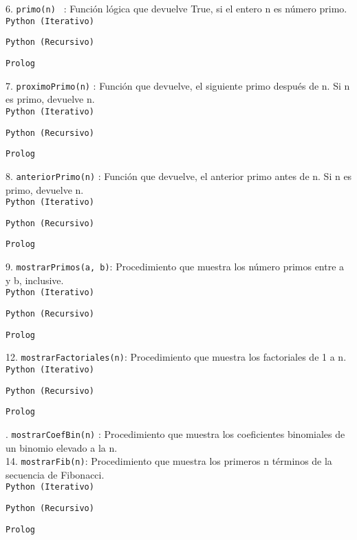 \documentclass[10pt,letterpaper]{article}
\begin{document}
6. \texttt{primo(n) } : Función lógica que devuelve True, si el entero n es número primo. \\

\texttt{Python (Iterativo)}


\texttt{Python (Recursivo)}


\texttt{Prolog}


7. \texttt{proximoPrimo(n)} : Función que devuelve, el siguiente primo después de n. Si n es primo, devuelve n. \\

\texttt{Python (Iterativo)}


\texttt{Python (Recursivo)}


\texttt{Prolog}


8. \texttt{anteriorPrimo(n)} : Función que devuelve, el anterior primo antes de n. Si n es primo, devuelve n. \\

\texttt{Python (Iterativo)}


\texttt{Python (Recursivo)}


\texttt{Prolog}


9. \texttt{mostrarPrimos(a, b)}: Procedimiento que muestra los número primos entre a y b, inclusive. \\

\texttt{Python (Iterativo)}


\texttt{Python (Recursivo)}


\texttt{Prolog}


12. \texttt{mostrarFactoriales(n)}: Procedimiento que muestra los factoriales de 1 a n. \\

\texttt{Python (Iterativo)}


\texttt{Python (Recursivo)}


\texttt{Prolog}


. \texttt{mostrarCoefBin(n)} : Procedimiento que muestra los coeficientes binomiales de un binomio elevado a la n. \\

14. \texttt{mostrarFib(n)}: Procedimiento que muestra los primeros n términos de la secuencia de Fibonacci. \\
\texttt{Python (Iterativo)}


\texttt{Python (Recursivo)}


\texttt{Prolog}

\end{document}
